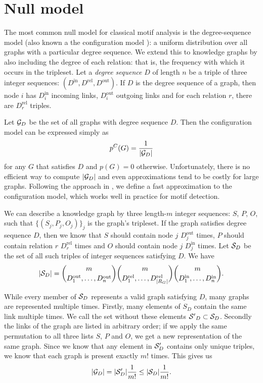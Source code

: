 \documentclass[letterpaper]{article} %
\newcommand{\G}{{\cal G}}
\begin{document}
\label{section:relevance-test}

\section{Null model}

\label{section:null-model}

The most common null model for classical motif analysis is the degree-sequence model (also known a the configuration model \cite{newman2010networks}): a uniform distribution over all graphs with a particular degree sequence. We extend this to knowledge graphs by also including the degree of each relation: that is, the frequency with which it occurs in the tripleset. Let a \emph{degree sequence} $D$ of length $n$ be a triple of three integer sequences: $(D^\text{in}, D^\text{rel}, D^\text{out})$. If $D$ is the degree sequence of a graph, then node $i$ has $D^\text{in}_i$ incoming links,  $D^\text{out}_i$ outgoing links and for each relation $r$, there are $D^\text{rel}_r$ triples.

Let $\G_D$ be the set of all graphs with degree sequence $D$. Then the configuration model can be expressed simply as
\[
p^C(G) = \frac{1}{|\G_D|}
\]
for any $G$ that satisfies $D$ and $p(G) = 0$ otherwise. Unfortunately, there is no efficient way to compute $|\G_D|$ and even approximations tend to be costly for large graphs. Following the approach in \cite{bloem2017large}, we define a fast approximation to the configuration model, which works well in practice for motif detection. 

We can describe a knowledge graph by three length-$m$ integer sequences: $S$, $P$, $O$, such that $\{(S_j, P_j, O_j)\}_j$ is the graph's tripleset. If the graph satisfies degree sequence $D$, then we know that $S$ should contain node $j$ $D^\text{out}_j$ times, $P$ should contain relation $r$ $D^\text{rel}_r$ times and $O$ should contain node $j$ $D^\text{in}_j$ times.  Let ${\cal S}_D$ be the set of all such triples of integer sequences satisfying $D$. We have 
\[
|{\cal S}_D| =
 {m \choose {D_1^\text{out}, \ldots, D_n^\text{out}} }
 {m \choose {D_1^\text{rel}, \ldots, D_{|R_G|}^\text{rel}} }
 {m \choose {D_1^\text{in}, \ldots, D_n^\text{in}} } \text{.}
\]

While every member of ${\cal S}_D$ represents a valid graph satisfying $D$, many graphs are represented multiple times. Firstly, many elements of ${S}_D$ contain the same link multiple times. We call the set without these elements ${\cal S'}_D \subset {\cal S}_D$. Secondly the links of the graph are listed in arbitrary order; if we apply the same permutation to all three lists $S$, $P$ and $O$, we get a new representation of the same graph. Since we know that any element in ${\cal S}'_D$ contains only unique triples, we know that each graph is present exactly $m!$ times. This gives us
\[
|\G_D| = |{\cal S}'_D| \frac{1}{m!} \leq  |{\cal S}_D| \frac{1}{m!} \text{.}
\]
\end{document}
